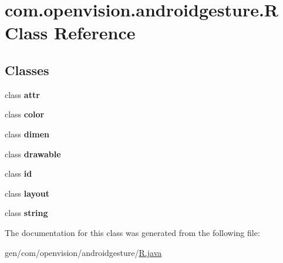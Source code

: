 \hypertarget{classcom_1_1openvision_1_1androidgesture_1_1_r}{\section{com.\-openvision.\-androidgesture.\-R \-Class \-Reference}
\label{classcom_1_1openvision_1_1androidgesture_1_1_r}
}
\subsection*{\-Classes}
\begin{DoxyCompactItemize}
\item 
class {\bfseries attr}
\item 
class {\bfseries color}
\item 
class {\bfseries dimen}
\item 
class {\bfseries drawable}
\item 
class {\bfseries id}
\item 
class {\bfseries layout}
\item 
class {\bfseries string}
\end{DoxyCompactItemize}


\-The documentation for this class was generated from the following file\-:\begin{DoxyCompactItemize}
\item 
gen/com/openvision/androidgesture/\hyperlink{_r_8java}{\-R.\-java}\end{DoxyCompactItemize}
